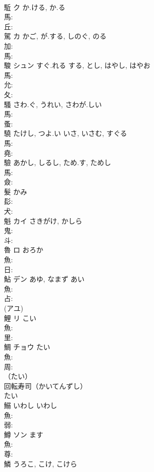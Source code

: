 \documentclass[8pt]{extreport}
\begin{document}
\begin{CJK}{UTF8}{min}
\\	駈	ク	か.ける, か.る		
\\	馬: 
\\	丘: 
\\	駕	カ	かご, が.する, しのぐ, のる		
\\	加: 
\\	馬: 
\\	駿	シュン	すぐ.れる	する, とし, はやし, はやお	
\\	馬: 
\\	允: 
\\	夂: 
\\	騷		さわ.ぐ, うれい, さわが.しい				
\\	馬: 
\\	蚤: 
\\	驍		たけし, つよ.い	いさ, いさむ, すぐる			
\\	馬: 
\\	堯: 
\\	驗		あかし, しるし, ため.す, ためし				
\\	馬: 
\\	僉: 
\\	髮		かみ				
\\	髟: 
\\	犬: 
\\	魁	カイ	さきがけ, かしら		
\\	鬼: 
\\	斗: 
\\	魯	ロ	おろか		
\\	魚: 
\\	日: 
\\	鮎	デン	あゆ, なまず	あい	
\\	魚: 
\\	占: 
\\	(アユ) 
\\	鯉	リ	こい		
\\	魚: 
\\	里: 
\\	鯛	チョウ	たい		
\\	魚: 
\\	周: 
\\	（たい） 
\\	回転寿司（かいてんずし） 
\\	たい
\\	鰯	いわし	いわし		
\\	魚: 
\\	弱: 
\\	鱒	ソン	ます		
\\	魚: 
\\	尊: 
\\	鱗		うろこ, こけ, こけら				

\end{CJK}
\end{document}
